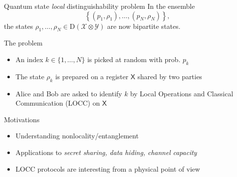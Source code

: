 \documentclass{beamer}
\def\X{\mathcal{X}}
\def\Y{\mathcal{Y}}
\newcommand{\setft}[1]{\mathrm{#1}}
\newcommand{\Density}{\setft{D}}
\newcommand{\reg}[1]{\mathsf{#1}}
\begin{document}
    \begin{frame}{Quantum state \emph{local} distinguishability problem}
        In the ensemble
        \[
          \left\{(p_{1}, \rho_{1}), \ldots, (p_{N}, \rho_{N}) \right\},
        \]
        the states $\rho_{1},\ldots,\rho_{N}\in\Density(\X\otimes\Y)$ 
        are now bipartite states.
        \begin{block}{The problem}
          \begin{itemize}
          \item An index $k\in\{1, \ldots, N\}$ is picked at random with prob. $p_{k}$
          \item The state $\rho_{k}$ is prepared on a register $\reg{X}$ shared by two parties
          \item Alice and Bob are asked to identify $k$ by Local Operations and Classical Communication (LOCC) on $\reg{X}$
          \end{itemize}
        \end{block}
        \begin{block}{Motivations}
            \begin{itemize}
                \item Understanding nonlocality/entanglement
                \item Applications to \emph{secret sharing, data hiding, channel capacity}
                \item LOCC protocols are interesting from a physical point of view
            \end{itemize}
        \end{block}
    \end{frame}
\end{document}
